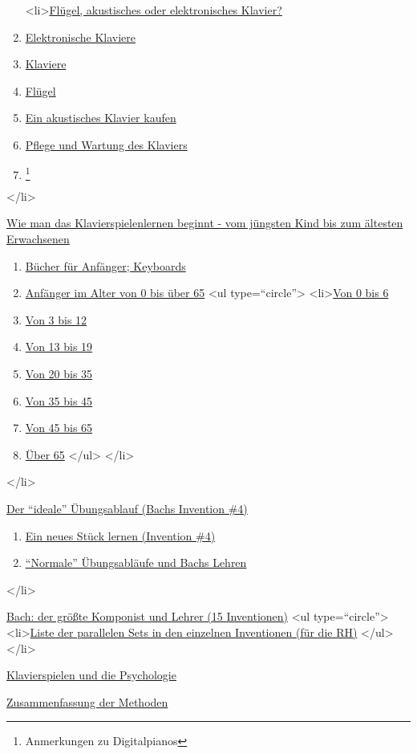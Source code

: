   \begin{enumerate}[label={\alph*.}] 
   <li>\hyperlink{c1iii17a}{Flügel, akustisches oder elektronisches Klavier?}
   \item \hyperlink{c1iii17b}{Elektronische Klaviere}
   \item \hyperlink{c1iii17c}{Klaviere}
   \item \hyperlink{c1iii17d}{Flügel}
   \item \hyperlink{c1iii17e}{Ein akustisches Klavier kaufen}
   \item \hyperlink{c1iii17f}{Pflege und Wartung des Klaviers}
   \item \hyperlink{c1iii17g}{\footnote{Anmerkungen zu Digitalpianos}}
   \end{enumerate}
 </li>
 \item \hyperlink{c1iii18}{Wie man das Klavierspielenlernen beginnt - vom jüngsten Kind bis zum ältesten Erwachsenen}
     \begin{enumerate}[label={\alph*.}] 
        <li>\hyperlink{c1iii18a}{Benötigt man einen Lehrer?}
        \item \hyperlink{c1iii18b}{Bücher für Anfänger; Keyboards}
        \item \hyperlink{c1iii18c}{Anfänger im Alter von 0 bis über 65}
            <ul type=\enquote{circle}>
               <li>\hyperlink{c1iii18c0}{Von 0 bis 6}
               \item \hyperlink{c1iii18c3}{Von 3 bis 12}
               \item \hyperlink{c1iii18c13}{Von 13 bis 19}
               \item \hyperlink{c1iii18c20}{Von 20 bis 35}
               \item \hyperlink{c1iii18c35}{Von 35 bis 45}
               \item \hyperlink{c1iii18c45}{Von 45 bis 65}
               \item \hyperlink{c1iii18c65}{Über 65}
            </ul>
        </li>
      \end{enumerate}
 </li>
 \item \hyperlink{c1iii19}{Der \enquote{ideale} Übungsablauf (Bachs Invention \#4)}
     \begin{enumerate}[label={\alph*.}] 
        <li>\hyperlink{c1iii19a}{Die Regeln lernen}
        \item \hyperlink{c1iii19b}{Ein neues Stück lernen (Invention \#4)}
        \item \hyperlink{c1iii19c}{\enquote{Normale} Übungsabläufe und Bachs Lehren}
      \end{enumerate}
 </li>
 \item \hyperlink{c1iii20}{Bach: der größte Komponist und Lehrer (15 Inventionen)}
   <ul type=\enquote{circle}>
    <li>\hyperlink{c1iii20ps}{Liste der parallelen Sets in den einzelnen Inventionen (für die RH)}
   </ul>
 </li>
 \item \hyperlink{c1iii21}{Klavierspielen und die Psychologie}
 \item \hyperlink{c1iii22}{Zusammenfassung der Methoden}

